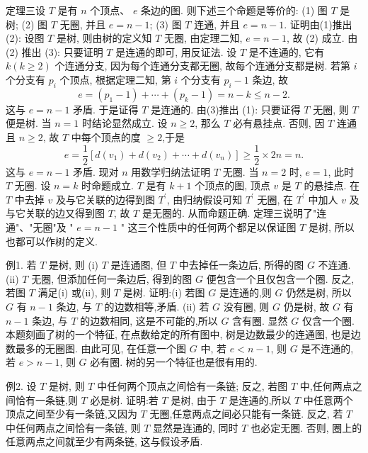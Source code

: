 定理三设 $T$ 是有 $n$ 个顶点、 $e$ 条边的图.
则下述三个命题是等价的:
(1) 图 $T$ 是树;
(2) 图 $T$ 无圈, 并且 $e=n-1$;
(3) 图 $T$ 连通, 并且 $e=n-1$.
证明由(1)推出 (2):
设图 $T$ 是树, 则由树的定义知 $T$ 无圈, 由定理二知, $e=n-1$, 故 (2) 成立.
由 (2) 推出 (3):
只要证明 $T$ 是连通的即可, 用反证法.
设 $T$ 是不连通的, 它有 $k(k \geqslant 2)$ 个连通分支, 因为每个连通分支都无圈, 故每个连通分支都是树.
若第 $i$ 个分支有 $p_i$ 个顶点, 根据定理二知, 第 $i$ 个分支有 $p_i-1$ 条边, 故
$$
e=\left(p_1-1\right)+\cdots+\left(p_k-1\right)=n-k \leqslant n-2 .
$$
这与 $e=n-1$ 矛盾.
于是证得 $T$ 是连通的.
由(3)推出 (1):
只要证得 $T$ 无圈, 则 $T$ 便是树.
当 $n=1$ 时结论显然成立.
设 $n \geqslant 2$, 那么 $T$ 必有悬挂点.
否则, 因 $T$ 连通且 $n \geqslant 2$, 故 $T$ 中每个顶点的度 $\geqslant 2$,于是
$$
e=\frac{1}{2}\left[d\left(v_1\right)+d\left(v_2\right)+\cdots+d\left(v_n\right)\right] \geqslant \frac{1}{2} \times 2 n=n .
$$
这与 $e=n-1$ 矛盾.
现对 $n$ 用数学归纳法证明 $T$ 无圈.
当 $n=2$ 时, $e=1$, 此时 $T$ 无圈.
设 $n=k$ 时命题成立.
$T$ 是有 $k+1$ 个顶点的图, 顶点 $v$ 是 $T$ 的悬挂点.
在 $T$ 中去掉 $v$ 及与它关联的边得到图 $T^{\prime}$, 由归纳假设可知 $T^{\prime}$ 无圈, 在 $T^{\prime}$ 中加人 $v$ 及与它关联的边又得到图 $T$, 故 $T$ 是无圈的.
从而命题正确.
定理三说明了"连通"、"无圈"及 " $e=n-1$ " 这三个性质中的任何两个都足以保证图 $T$ 是树, 所以也都可以作树的定义.



例1. 若 $T$ 是树, 则
(i) $T$ 是连通图, 但 $T$ 中去掉任一条边后, 所得的图 $G$ 不连通.
(ii) $T$ 无圈, 但添加任何一条边后, 得到的图 $G$ 便包含一个且仅包含一个圈.
反之, 若图 $T$ 满足(i) 或(ii), 则 $T$ 是树.
证明:(i) 若图 $G$ 是连通的,则 $G$ 仍然是树, 所以 $G$ 有 $n-1$ 条边, 与 $T$ 的边数相等,矛盾.
(ii) 若 $G$ 没有圈, 则 $G$ 仍是树, 故 $G$ 有 $n-1$ 条边, 与 $T$ 的边数相同, 这是不可能的,所以 $G$ 含有圈.
显然 $G$ 仅含一个圈.
本题刻画了树的一个特征, 在点数给定的所有图中, 树是边数最少的连通图, 也是边数最多的无圈图.
由此可见, 在任意一个图 $G$ 中, 若 $e<n-1$, 则 $G$ 是不连通的,若 $e>n-1$, 则 $G$ 必有圈.
树的另一个特征也是很有用的.



例2. 设 $T$ 是树, 则 $T$ 中任何两个顶点之间恰有一条链; 反之, 若图 $T$ 中,任何两点之间恰有一条链,则 $T$ 必是树.
证明:若 $T$ 是树, 由于 $T$ 是连通的,所以 $T$ 中任意两个顶点之间至少有一条链,又因为 $T$ 无圈,任意两点之间必只能有一条链.
反之, 若 $T$ 中任何两点之间恰有一条链, 则 $T$ 显然是连通的, 同时 $T$ 也必定无圈.
否则, 圈上的任意两点之间就至少有两条链, 这与假设矛盾.



